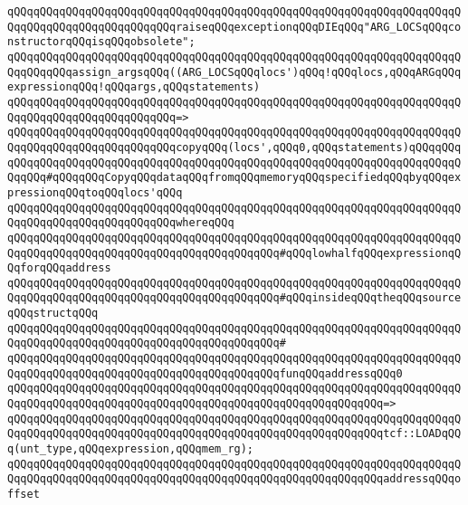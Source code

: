 \verb|qQQqqQQqqQQqqQQqqQQqqQQqqQQqqQQqqQQqqQQqqQQqqQQqqQQqqQQqqQQqqQQqqQQqqQQqqQQqqQQqqQQqqQQqqQQqqQQqraiseqQQqexceptionqQQqDIEqQQq"ARG_LOCSqQQqconstructorqQQqisqQQqobsolete";|\newline
\newline
\verb|qQQqqQQqqQQqqQQqqQQqqQQqqQQqqQQqqQQqqQQqqQQqqQQqqQQqqQQqqQQqqQQqqQQqqQQqqQQqqQQqassign_argsqQQq((ARG_LOCSqQQqlocs')qQQq!qQQqlocs,qQQqARGqQQqexpressionqQQq!qQQqargs,qQQqstatements)|\newline
\verb|qQQqqQQqqQQqqQQqqQQqqQQqqQQqqQQqqQQqqQQqqQQqqQQqqQQqqQQqqQQqqQQqqQQqqQQqqQQqqQQqqQQqqQQqqQQqqQQq=>|\newline
\verb|qQQqqQQqqQQqqQQqqQQqqQQqqQQqqQQqqQQqqQQqqQQqqQQqqQQqqQQqqQQqqQQqqQQqqQQqqQQqqQQqqQQqqQQqqQQqqQQqcopyqQQq(locs',qQQq0,qQQqstatements)qQQqqQQqqQQqqQQqqQQqqQQqqQQqqQQqqQQqqQQqqQQqqQQqqQQqqQQqqQQqqQQqqQQqqQQqqQQqqQQqqQQq#qQQqqQQqCopyqQQqdataqQQqfromqQQqmemoryqQQqspecifiedqQQqbyqQQqexpressionqQQqtoqQQqlocs'qQQq|\newline
\verb|qQQqqQQqqQQqqQQqqQQqqQQqqQQqqQQqqQQqqQQqqQQqqQQqqQQqqQQqqQQqqQQqqQQqqQQqqQQqqQQqqQQqqQQqqQQqqQQqwhereqQQq|\newline
\newline
\verb|qQQqqQQqqQQqqQQqqQQqqQQqqQQqqQQqqQQqqQQqqQQqqQQqqQQqqQQqqQQqqQQqqQQqqQQqqQQqqQQqqQQqqQQqqQQqqQQqqQQqqQQqqQQqqQQq#qQQqlowhalfqQQqexpressionqQQqforqQQqaddress|\newline
\verb|qQQqqQQqqQQqqQQqqQQqqQQqqQQqqQQqqQQqqQQqqQQqqQQqqQQqqQQqqQQqqQQqqQQqqQQqqQQqqQQqqQQqqQQqqQQqqQQqqQQqqQQqqQQqqQQq#qQQqinsideqQQqtheqQQqsourceqQQqstructqQQq|\newline
\verb|qQQqqQQqqQQqqQQqqQQqqQQqqQQqqQQqqQQqqQQqqQQqqQQqqQQqqQQqqQQqqQQqqQQqqQQqqQQqqQQqqQQqqQQqqQQqqQQqqQQqqQQqqQQqqQQq#|\newline
\verb|qQQqqQQqqQQqqQQqqQQqqQQqqQQqqQQqqQQqqQQqqQQqqQQqqQQqqQQqqQQqqQQqqQQqqQQqqQQqqQQqqQQqqQQqqQQqqQQqqQQqqQQqqQQqqQQqfunqQQqaddressqQQq0|\newline
\verb|qQQqqQQqqQQqqQQqqQQqqQQqqQQqqQQqqQQqqQQqqQQqqQQqqQQqqQQqqQQqqQQqqQQqqQQqqQQqqQQqqQQqqQQqqQQqqQQqqQQqqQQqqQQqqQQqqQQqqQQqqQQqqQQq=>|\newline
\verb|qQQqqQQqqQQqqQQqqQQqqQQqqQQqqQQqqQQqqQQqqQQqqQQqqQQqqQQqqQQqqQQqqQQqqQQqqQQqqQQqqQQqqQQqqQQqqQQqqQQqqQQqqQQqqQQqqQQqqQQqqQQqqQQqtcf::LOADqQQq(unt_type,qQQqexpression,qQQqmem_rg);|\newline
\newline
\verb|qQQqqQQqqQQqqQQqqQQqqQQqqQQqqQQqqQQqqQQqqQQqqQQqqQQqqQQqqQQqqQQqqQQqqQQqqQQqqQQqqQQqqQQqqQQqqQQqqQQqqQQqqQQqqQQqqQQqqQQqqQQqqQQqaddressqQQqoffset|\newline
